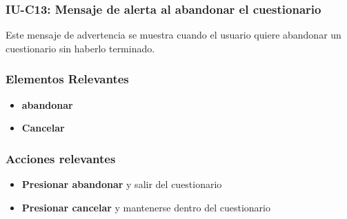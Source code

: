 
\subsubsection{IU-C13: Mensaje de alerta al abandonar el cuestionario}

Este mensaje de advertencia se muestra cuando el usuario quiere abandonar un cuestionario sin haberlo terminado.


\subsubsection{Elementos Relevantes}

    \begin{itemize}
    \item {\bf abandonar}
    \item {\bf Cancelar}
    \end{itemize}

\subsubsection{Acciones relevantes}

    \begin{itemize}
    \item {\bf Presionar abandonar} y salir del cuestionario
    \item {\bf Presionar cancelar} y mantenerse dentro del cuestionario
    \end{itemize}

\clearpage
